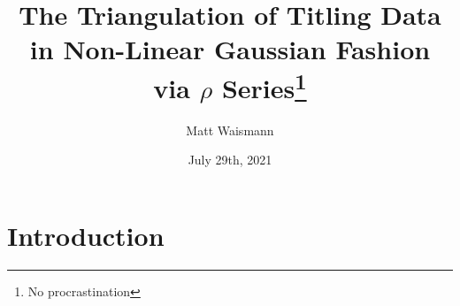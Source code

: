 \documentclass{article}%
\title{The Triangulation of Titling Data in Non-Linear Gaussian Fashion via $\rho$ Series\thanks{No procrastination}}
\date{July 29th, 2021}
\author{Matt Waismann}
\begin{document}
\maketitle
\section{Introduction}
\blindtext
\end{document}
